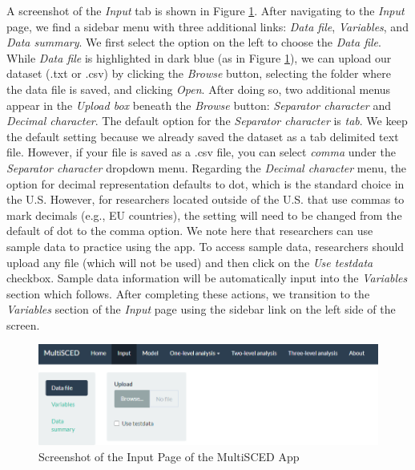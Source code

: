 \documentclass[
]{book}
\begin{document}
A screenshot of the \emph{Input} tab is shown in Figure \ref{fig:MultiSCED-input-datafile}. After navigating to the \emph{Input} page, we find a sidebar menu with three additional links: \emph{Data file}, \emph{Variables}, and \emph{Data summary}. We first select the option on the left to choose the \emph{Data file}. While \emph{Data file} is highlighted in dark blue (as in Figure \ref{fig:MultiSCED-input-datafile}), we can upload our dataset (.txt or .csv) by clicking the \emph{Browse} button, selecting the folder where the data file is saved, and clicking \emph{Open}. After doing so, two additional menus appear in the \emph{Upload box} beneath the \emph{Browse} button: \emph{Separator character} and \emph{Decimal character}. The default option for the \emph{Separator character} is \emph{tab}. We keep the default setting because we already saved the dataset as a tab delimited text file. However, if your file is saved as a .csv file, you can select \emph{comma} under the \emph{Separator character} dropdown menu. Regarding the \emph{Decimal character} menu, the option for decimal representation defaults to dot, which is the standard choice in the U.S. However, for researchers located outside of the U.S. that use commas to mark decimals (e.g., EU countries), the setting will need to be changed from the default of dot to the comma option. We note here that researchers can use sample data to practice using the app. To access sample data, researchers should upload any file (which will not be used) and then click on the \emph{Use testdata} checkbox. Sample data information will be automatically input into the \emph{Variables} section which follows. After completing these actions, we transition to the \emph{Variables} section of the \emph{Input} page using the sidebar link on the left side of the screen.

\begin{figure}
\includegraphics[width=0.6\linewidth]{images/MultiSCED_input.datafile} \caption{Screenshot of the Input Page of the MultiSCED App}\label{fig:MultiSCED-input-datafile}
\end{figure}
\end{document}
